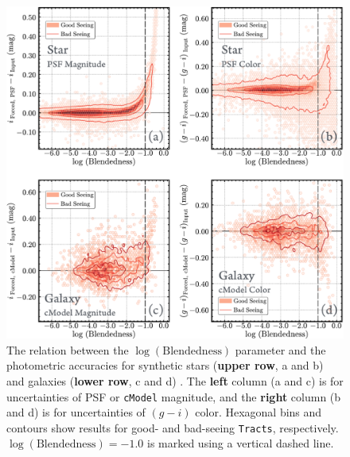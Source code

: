 \documentclass[useamsfonts]{pasj01}
\def\cmodel{\texttt{cModel}}
\def\tracts{\texttt{Tracts}}
\begin{document}
\begin{figure}
    \begin{center}
        \includegraphics[width=\textwidth]{fig/synpipe_blendedness_err}
    \end{center}
    \caption{
        The relation between the $\log(\mathrm{Blendedness})$ parameter
        and the photometric accuracies for synthetic stars (\textbf{upper row}, a and b) and
        galaxies (\textbf{lower row}, c and d) .
       The \textbf{left} column (a and c) is for uncertainties of PSF or \cmodel{} magnitude,
        and the \textbf{right} column (b and d) is for uncertainties of $(g-i)$ color.
        Hexagonal bins and contours show results for good- and bad-seeing
        \tracts{}, respectively.
        $\log(\mathrm{Blendedness}) = -1.0$ is marked using a vertical dashed line.
        }
    \label{fig:blend}
\end{figure}
\end{document}

